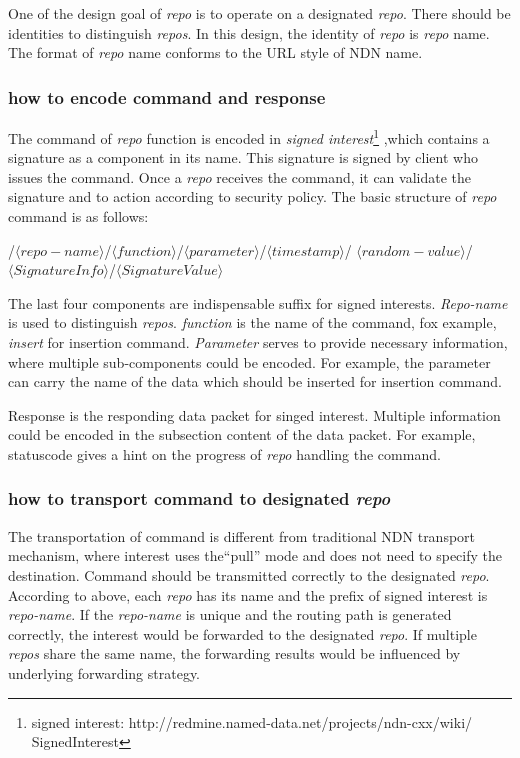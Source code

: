 \documentclass[conference]{IEEEtran}
\begin{document}
One of the design goal of \emph{repo} is to operate on a designated \emph{repo}. There should be identities to distinguish \emph{repos}. In this design, the identity of \emph{repo} is \emph{repo} name. The format of \emph{repo} name conforms to the URL style of NDN name.

\subsubsection{how to encode command and response}

The command of \emph{repo} function is encoded in \emph{signed interest}\footnote{signed interest: http://redmine.named-data.net/projects/ndn-cxx/wiki/
SignedInterest} ,which contains a signature as a component in its name. This signature is signed by client who issues the command. Once a \emph{repo} receives the command, it can validate the signature and to action according to security policy. The basic structure of \emph{repo} command is as follows:

/$\langle repo-name\rangle$/$\langle function\rangle$/$\langle parameter\rangle$/$\langle timestamp\rangle$/
$\langle random-value\rangle$/$\langle SignatureInfo\rangle$/$\langle SignatureValue\rangle$

The last four components are indispensable suffix for signed interests. \emph{Repo-name} is used to distinguish \emph{repos}. \emph{function} is the name of the command, fox example, \emph{insert} for insertion command. \emph{Parameter} serves to provide necessary information, where multiple sub-components could be encoded. For example, the parameter can carry the name of the data which should be inserted for insertion command.

Response is the responding data packet for singed interest. Multiple information could be encoded in the subsection content of the data packet. For example, statuscode gives a hint on the progress of \emph{repo} handling the command.

\subsubsection{how to transport command to designated \emph{repo}}

The transportation of command is different from traditional NDN transport mechanism, where interest uses the``pull'' mode and does not need to specify the destination. Command should be transmitted correctly to the designated \emph{repo}. According to above, each \emph{repo} has its name and the prefix of signed interest is \emph{repo-name}. If the \emph{repo-name} is unique and the routing path is generated correctly, the interest would be forwarded to the designated \emph{repo}. If multiple \emph{repos} share the same name, the forwarding results would be influenced by underlying forwarding strategy.
\end{document}
